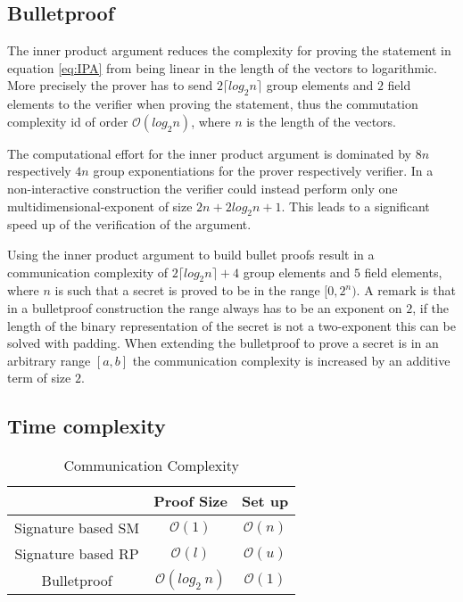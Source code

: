 


\subsection{Bulletproof}
The inner product argument reduces the complexity for proving the statement  in equation \eqref{eq:IPA} from being linear in the length of the vectors to logarithmic. More precisely the prover has to send $2\lceil log_2 n \rceil$ group elements and $2$ field elements to the verifier when proving the statement, thus the commutation complexity id of order $\mathcal{O}(log_2 n)$, where $n$ is the length of the vectors. 

The computational effort for the inner product argument is dominated by $8n$ respectively $4n$ group exponentiations for the prover respectively verifier. In a non-interactive construction the verifier could instead perform only one multidimensional-exponent of size $2n+ 2log_2n +1$. This leads to a significant speed up of the verification of the argument.     

Using the inner product argument to build bullet proofs result in a communication complexity of $2\lceil log_2 n \rceil +4$ group elements and $5$ field elements, where $n$ is such that a secret  is proved to be in the range $[0,2^n)$.  A remark is that in a bulletproof construction the range always has to be an exponent on $2$, if the length of the binary representation of the secret is not a two-exponent this can be solved with padding. When extending the bulletproof to prove a secret is in an arbitrary range $[a,b]$ the communication complexity is increased by an additive term of size $2$. 


 

\subsection{Time complexity}
\begin{table}[H]
\label{tab:compare}
\caption{Communication Complexity}
\begin{tabular}{| *{3}{c|}}
			 \hline
    									&Proof Size 		&		Set up  \\ \hline		
  Signature based SM  	&   $\mathcal{O} (1) $ 					 &			 $\mathcal{O} (n)$				\\ \hline 
  Signature based RP  	&   $\mathcal{O} (l)$   	&	$\mathcal{O} (u)$ 
  	\\ \hline
  Bulletproof   				&   $ \mathcal{O} (  log_2\: n ) $  & $\mathcal{O} (1)$ 	\\
  \hline			
\end{tabular}
 \end{table}
	

